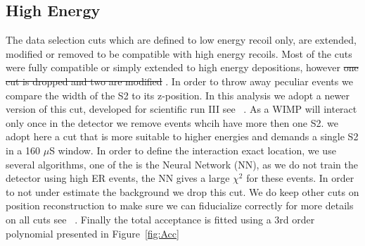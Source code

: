 

\subsection{High Energy}
\label{subsubsec:HighE}


The data selection cuts which are defined to low energy recoil only, are extended, modified or removed to be compatible with high energy recoils. Most of the cuts were fully compatible or simply extended to high energy depositions, however \sout{one cut is dropped and two are modified} . In order to throw away peculiar events we compare the width of the S2 to its z-position. In this analysis we adopt a newer version of this cut, developed for scientific run III see ~\cite{xe100_run_combination}. As a WIMP will interact only once in the detector we remove events whcih have more then one S2. we adopt here a cut that is more suitable to higher energies and demands a single S2 in a 160 $\mu$S window. In order to define the interaction exact location, we use several algorithms, one of the is the Neural Network (NN), as we do not train the detector using high ER events, the NN gives a large $\chi^2$ for these events. In order to not under estimate the background we drop this cut. We do keep other cuts on position reconstruction to make sure we can fiducialize correctly for more details on all cuts see ~\cite{xe100_ana2012}. Finally the total acceptance is fitted using a 3rd order polynomial presented in Figure~\ref{fig:Acc}

